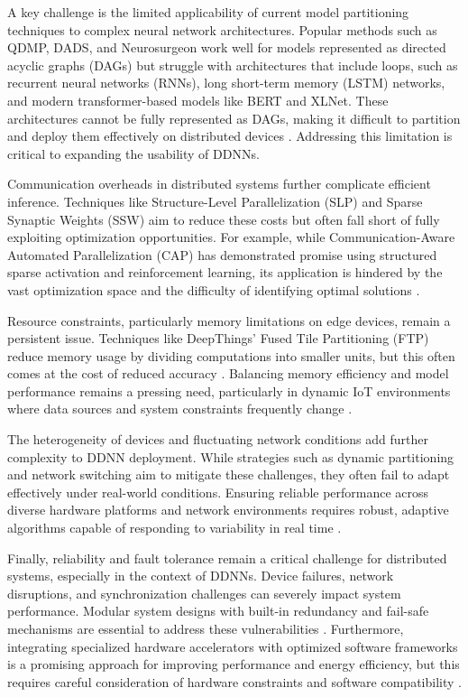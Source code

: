 \documentclass[conference]{IEEEtran}
\begin{document}
A key challenge is the limited applicability of current model partitioning techniques to complex neural network architectures. Popular methods such as QDMP, DADS, and Neurosurgeon work well for models represented as directed acyclic graphs (DAGs) but struggle with architectures that include loops, such as recurrent neural networks (RNNs), long short-term memory (LSTM) networks, and modern transformer-based models like BERT and XLNet. These architectures cannot be fully represented as DAGs, making it difficult to partition and deploy them effectively on distributed devices \cite{zhang2021dynamic, zhao2018deepthings, zhou2021dynamic}. Addressing this limitation is critical to expanding the usability of DDNNs.

Communication overheads in distributed systems further complicate efficient inference. Techniques like Structure-Level Parallelization (SLP) and Sparse Synaptic Weights (SSW) aim to reduce these costs but often fall short of fully exploiting optimization opportunities. For example, while Communication-Aware Automated Parallelization (CAP) has demonstrated promise using structured sparse activation and reinforcement learning, its application is hindered by the vast optimization space and the difficulty of identifying optimal solutions \cite{zou2021cap}.

Resource constraints, particularly memory limitations on edge devices, remain a persistent issue. Techniques like DeepThings' Fused Tile Partitioning (FTP) reduce memory usage by dividing computations into smaller units, but this often comes at the cost of reduced accuracy \cite{zhao2018deepthings}. Balancing memory efficiency and model performance remains a pressing need, particularly in dynamic IoT environments where data sources and system constraints frequently change \cite{mohammed2020distributed, naveen2021low}.

The heterogeneity of devices and fluctuating network conditions add further complexity to DDNN deployment. While strategies such as dynamic partitioning and network switching aim to mitigate these challenges, they often fail to adapt effectively under real-world conditions. Ensuring reliable performance across diverse hardware platforms and network environments requires robust, adaptive algorithms capable of responding to variability in real time \cite{karjee2022split, li2019edge}.


Finally, reliability and fault tolerance remain a critical challenge for distributed systems, especially in the context of DDNNs. Device failures, network disruptions, and synchronization challenges can severely impact system performance. Modular system designs with built-in redundancy and fail-safe mechanisms are essential to address these vulnerabilities \cite{zeng2020coedge}. Furthermore, integrating specialized hardware accelerators with optimized software frameworks is a promising approach for improving performance and energy efficiency, but this requires careful consideration of hardware constraints and software compatibility \cite{kress2022hardware, naveen2021low}.
\end{document}
